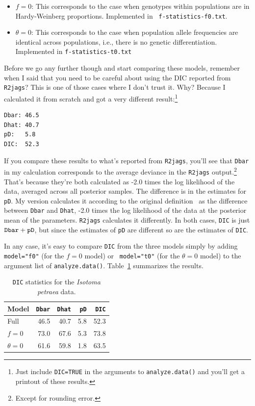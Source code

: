 \begin{itemize}

\item $f=0$: This corresponds to the case when genotypes within
  populations are in Hardy-Weinberg proportions. Implemented in {\tt
    f-statistics-f0.txt}.

\item $\theta=0$: This corresponds to the case when population allele
  frequencies are identical across populations, i.e., there is no
  genetic differentiation. Implemented in {\tt f-statistics-t0.txt}

\end{itemize}
Before we go any further though and start comparing these models,
remember when I said that you need to be careful about using the DIC
reported from {\tt R2jags}? This is one of those cases where I don't
trust it. Why? Because I calculated it from scratch and got a very
different result:\footnote{Just include {\tt DIC=TRUE} in the
  arguments to {\tt analyze.data()} and you'll get a printout of these
  results.}
\begin{verbatim}
Dbar: 46.5
Dhat: 40.7
pD:   5.8
DIC:  52.3
\end{verbatim}
If you compare these results to what's reported from {\tt R2jags},
you'll see that {\tt Dbar} in my calculation corresponds to the
average deviance in the {\tt R2jags} output.\footnote{Except for
  rounding error.} That's because they're both calculated as -2.0
times the log likelihood of the data, averaged across all posterior
samples. The difference is in the estimates for {\tt pD}. My version
calculates it according to the original
definition~\cite{Spiegelhalter-etal-2002} as the difference between
{\tt Dbar} and {\tt Dhat}, -2.0 times the log likelihood of the data
at the posterior mean of the parameters. {\tt R2jags} calculates it
differently. In both cases, {\tt DIC} is just $\mbox{\tt
  Dbar}+\mbox{\tt pD}$, but since the estimates of {\tt pD} are
different so are the estimates of {\tt DIC}.

In any case, it's easy to compare {\tt DIC} from the three models
simply by adding {\tt model="f0"} (for the $f=0$ model) or {\tt
  model="t0"} (for the $\theta=0$ model) to the argument list of
{\tt analyze.data()}. Table~\ref{table:isotoma-DIC} summarizes the
results.

\begin{table}
\begin{center}
\begin{tabular}{l|rrrr}
\hline\hline
Model & {\tt Dbar} & {\tt Dhat} & {\tt pD} & {\tt DIC} \\
\hline
Full  & 46.5 & 40.7 & 5.8 & 52.3 \\
$f=0$ & 73.0 & 67.6 & 5.3 & 73.8 \\
$\theta=0$ & 61.6 & 59.8 & 1.8 & 63.5 \\
\hline
\end{tabular}
\end{center}
\caption{{\tt DIC} statistics for the {\it Isotoma petraea\/} data.}\label{table:isotoma-DIC}
\end{table}

